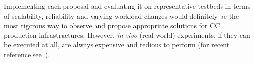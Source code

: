 Implementing each proposal and evaluating it on representative
testbeds in terms of scalability, reliability and varying workload
changes would definitely be the most rigorous way to observe and
propose appropriate solutions for CC production infrastructures.
However, \textit{in-vivo} (\ie real-world) experiments, if they can be
executed at all, are always expensive and tedious to perform (for
recent reference see~\cite{barker:pitfalls}).

